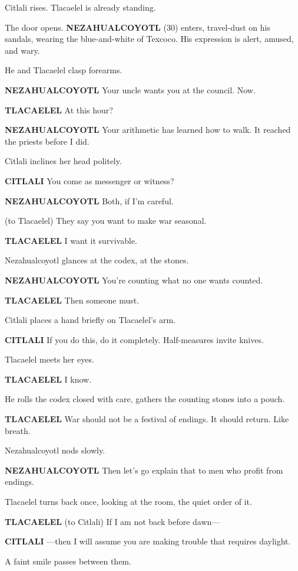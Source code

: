 \documentclass[12pt]{article}
\begin{document}
Citlali rises. Tlacaelel is already standing.

The door opens. \textbf{NEZAHUALCOYOTL} (30) enters, travel-dust on his sandals, wearing the blue-and-white of Texcoco. His expression is alert, amused, and wary.

He and Tlacaelel clasp forearms.

\textbf{NEZAHUALCOYOTL}  
Your uncle wants you at the council. Now.

\textbf{TLACAELEL}  
At this hour?

\textbf{NEZAHUALCOYOTL}  
Your arithmetic has learned how to walk.  
It reached the priests before I did.

Citlali inclines her head politely.

\textbf{CITLALI}  
You come as messenger or witness?

\textbf{NEZAHUALCOYOTL}  
Both, if I’m careful.

(to Tlacaelel)  
They say you want to make war seasonal.

\textbf{TLACAELEL}  
I want it survivable.

Nezahualcoyotl glances at the codex, at the stones.

\textbf{NEZAHUALCOYOTL}  
You’re counting what no one wants counted.

\textbf{TLACAELEL}  
Then someone must.

Citlali places a hand briefly on Tlacaelel’s arm.

\textbf{CITLALI}  
If you do this, do it completely.  
Half-measures invite knives.

Tlacaelel meets her eyes.

\textbf{TLACAELEL}  
I know.

He rolls the codex closed with care, gathers the counting stones into a pouch.

\textbf{TLACAELEL}  
War should not be a festival of endings.  
It should return.  
Like breath.

Nezahualcoyotl nods slowly.

\textbf{NEZAHUALCOYOTL}  
Then let’s go explain that to men who profit from endings.

Tlacaelel turns back once, looking at the room, the quiet order of it.

\textbf{TLACAELEL}  
(to Citlali)  
If I am not back before dawn—

\textbf{CITLALI}  
—then I will assume you are making trouble  
that requires daylight.

A faint smile passes between them.
\end{document}
